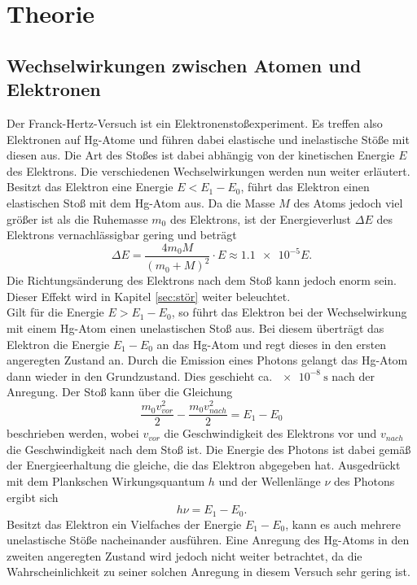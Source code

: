 \section{Theorie}
\label{sec:Theorie}

\subsection{Wechselwirkungen zwischen Atomen und Elektronen}
\label{sec:wechsel}
Der Franck-Hertz-Versuch ist ein Elektronenstoßexperiment. Es treffen also Elektronen auf Hg-Atome und führen dabei elastische und
inelastische Stöße mit diesen aus. Die Art des Stoßes ist dabei abhängig von der kinetischen Energie $E$ des Elektrons. Die verschiedenen
Wechselwirkungen werden nun weiter erläutert.
\\\noindent
Besitzt das Elektron eine Energie $E<E_1-E_0$, führt das Elektron einen elastischen Stoß mit dem Hg-Atom aus. Da die Masse $M$ des Atoms
jedoch viel größer ist als die Ruhemasse $m_0$ des Elektrons, ist der Energieverlust $\Delta E$ des Elektrons vernachlässigbar gering und beträgt
\begin{equation*}
    \Delta E=\frac{4m_0M}{(m_0+M)^2}\cdot E\approx \num{1.1e-5}E    .
\end{equation*}
Die Richtungsänderung des Elektrons nach dem Stoß kann jedoch enorm sein. Dieser Effekt wird in Kapitel \ref{sec:stör} weiter beleuchtet.
\\\noindent
Gilt für die Energie $E>E_1-E_0$, so führt das Elektron bei der Wechselwirkung mit einem Hg-Atom einen unelastischen Stoß aus. Bei diesem
überträgt das Elektron die Energie $E_1-E_0$ an das Hg-Atom und regt dieses in den ersten angeregten Zustand an. Durch die Emission eines
Photons gelangt das Hg-Atom dann wieder in den Grundzustand. Dies geschieht ca. $\SI{e-8}{\second}$ nach der Anregung. Der Stoß kann über
die Gleichung
\begin{equation}
    \frac{m_0v_{vor}^2}{2}-\frac{m_0v_{nach}^2}{2}=E_1-E_0
    \label{eqn:stoß}
\end{equation}
beschrieben werden, wobei $v_{vor}$ die Geschwindigkeit des Elektrons vor und $v_{nach}$ die Geschwindigkeit nach dem Stoß ist.
Die Energie des Photons ist dabei gemäß der Energieerhaltung die gleiche, die das Elektron abgegeben hat.
Ausgedrückt mit dem Plankschen Wirkungsquantum $h$ und der Wellenlänge $\nu$ des Photons ergibt sich
\begin{equation}
    h\nu=E_1-E_0    .
    \label{eqn:photon}
\end{equation}
Besitzt das Elektron ein Vielfaches der Energie $E_1-E_0$, kann es auch mehrere unelastische Stöße nacheinander ausführen. Eine Anregung
des Hg-Atoms in den zweiten angeregten Zustand wird jedoch nicht weiter betrachtet, da die Wahrscheinlichkeit zu seiner solchen Anregung
in diesem Versuch sehr gering ist.

